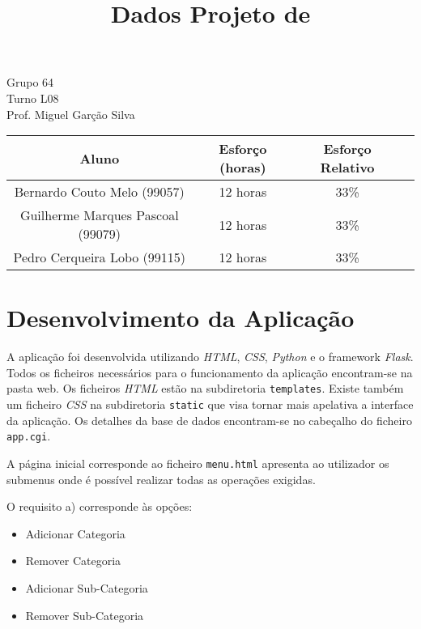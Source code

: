 \documentclass{article}
\title{{\Huge Dados Projeto de}}
\author{}
\date{}
\begin{document}
\maketitle
\begin{center}
	{\LARGE Grupo 64}\\
	\vspace{8mm}
	{\LARGE Turno L08}\\
	\vspace{8mm}
	{\LARGE Prof. Miguel Garção Silva}\\

	\vspace{7cm}

	\begin{tabular}{|c|c|c|c|} \hline
		\textbf{Aluno}                    & \textbf{Esforço (horas)} & \textbf{Esforço Relativo} \\ \hline
		Bernardo Couto Melo (99057)       & 12 horas                 & 33\%                      \\ \hline
		Guilherme Marques Pascoal (99079) & 12 horas                 & 33\%                      \\ \hline
		Pedro Cerqueira Lobo (99115)      & 12 horas                 & 33\%                      \\ \hline
	\end{tabular}

\end{center}

\pagebreak


\section{Desenvolvimento da Aplicação}
A aplicação foi desenvolvida utilizando \emph{HTML}, \emph{CSS}, \emph{Python} e o framework \emph{Flask}.\\
Todos os ficheiros necessários para o funcionamento da aplicação encontram-se
na pasta web. Os ficheiros \emph{HTML} estão na subdiretoria \texttt{templates}.
Existe também um ficheiro \emph{CSS} na subdiretoria \texttt{static} que visa tornar
mais apelativa a interface da aplicação.
Os detalhes da base de dados encontram-se no cabeçalho do ficheiro \texttt{app.cgi}.

A página inicial corresponde ao ficheiro \texttt{menu.html} apresenta ao
utilizador os submenus onde é possível realizar todas as operações exigidas.

O requisito a) corresponde às opções:
\begin{itemize}[leftmargin=+1.5cm]
	\item Adicionar Categoria
	\item Remover Categoria
	\item Adicionar Sub-Categoria
	\item Remover Sub-Categoria
\end{itemize}
\end{document}
